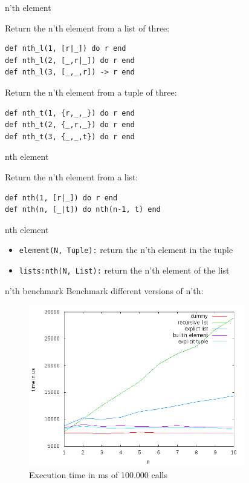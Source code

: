\begin{frame}[fragile]{n'th element}

Return the n'th element from a list of three:

\pause 
\begin{verbatim}
def nth_l(1, [r|_]) do r end
def nth_l(2, [_,r|_]) do r end
def nth_l(3, [_,_,r]) -> r end
\end{verbatim}

\pause Return the n'th element from a tuple of three:
\pause

\begin{verbatim}
def nth_t(1, {r,_,_}) do r end
def nth_t(2, {_,r,_}) do r end
def nth_t(3, {_,_,t}) do r end
\end{verbatim}

\end{frame}

\begin{frame}[fragile]{nth element}

Return the n'th element from a list:

\pause 
\begin{verbatim}
def nth(1, [r|_]) do r end
def nth(n, [_|t]) do nth(n-1, t) end
\end{verbatim}

\end{frame}


\begin{frame}{nth element}

\begin{itemize}
  \item {\tt element(N, Tuple):} return the n'th element in the tuple
  \item {\tt lists:nth(N, List):} return the n'th element of the list
\end{itemize}

\end{frame}

\begin{frame}{n'th benchmark}
Benchmark different versions of n'th:
 \begin{figure}
  \centering
  \includegraphics[height=200pt]{nth.png}
  \caption{Execution time in ms of 100.000 calls}
 \end{figure}

\end{frame}

